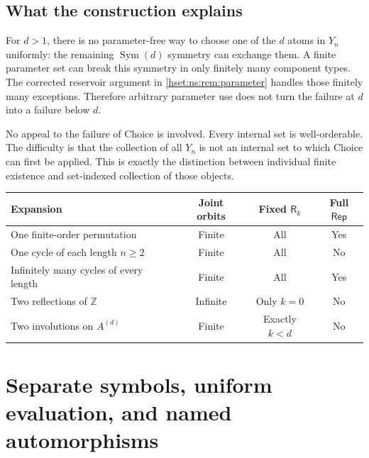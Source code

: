 \documentclass[11pt,letterpaper]{article}
\theoremstyle{definition}
\theoremstyle{remark}
\newcommand{\Sym}{\operatorname{Sym}}
\newcommand{\Rep}{\mathsf{Rep}}
\begin{document}
\subsection{What the construction explains}
For $d>1$, there is no parameter-free way to choose one of the $d$ atoms in $Y_n$ uniformly: the remaining $\Sym(d)$ symmetry can exchange them. A finite parameter set can break this symmetry in only finitely many component types. The corrected reservoir argument in \cref{hset:ns:rem:parameter} handles those finitely many exceptions. Therefore arbitrary parameter use does not turn the failure at $d$ into a failure below $d$.

No appeal to the failure of Choice is involved. Every internal set is well-orderable. The difficulty is that the collection of all $Y_n$ is not an internal set to which Choice can first be applied. This is exactly the distinction between individual finite existence and set-indexed collection of those objects.

\begin{center}
\small
\begin{tabularx}{\textwidth}{@{}Xccc@{}}
\toprule
Expansion & Joint orbits & Fixed $\mathsf R_k$ & Full $\Rep$\\
\midrule
One finite-order permutation & Finite & All & Yes\\
One cycle of each length $n\ge2$ & Finite & All & No\\
Infinitely many cycles of every length & Finite & All & Yes\\
Two reflections of $\mathbb Z$ & Infinite & Only $k=0$ & No\\
Two involutions on $A^{(d)}$ & Finite & Exactly $k<d$ & No\\
\bottomrule
\end{tabularx}
\end{center}

\section{Separate symbols, uniform evaluation, and named automorphisms}
\label{hset:ns:sec:language}
\end{document}
